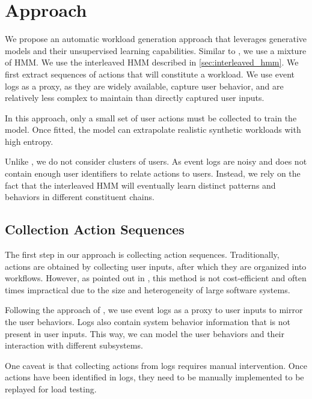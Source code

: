 \section{Approach}\label{sec:approach}

We propose an automatic workload generation approach that leverages generative models and their unsupervised learning capabilities. Similar to \cite{Yadwadkar2010-ml}, we use a mixture of HMM. We use the interleaved HMM described in \cref{sec:interleaved_hmm}. We first extract sequences of actions that will constitute a workload. We use event logs as a proxy, as they are widely available, capture user behavior, and are relatively less complex to maintain than directly captured user inputs.

In this approach, only a small set of user actions must be collected to train the model. Once fitted, the model can extrapolate realistic synthetic workloads with high entropy.

Unlike \cite{Chen2019-fu}, we do not consider clusters of users. As event logs are noisy and does not contain enough user identifiers \cite{Zhao2023-nh} to relate actions to users. Instead, we rely on the fact that the interleaved HMM will eventually learn distinct patterns and behaviors in different constituent chains.


\subsection{Collection Action Sequences}

The first step in our approach is collecting action sequences. Traditionally, actions are obtained by collecting user inputs, after which they are organized into workflows. However, as pointed out in \cite{Chen2019-fu}, this method is not cost-efficient and often times impractical due to the size and heterogeneity of large software systems.

Following the approach of \cite{Chen2019-fu}, we use event logs as a proxy to user inputs to mirror the user behaviors. Logs also contain system behavior information that is not present in user inputs. This way, we can model the user behaviors and their interaction with different subsystems.

One caveat is that collecting actions from logs requires manual intervention. Once actions have been identified in logs, they need to be manually implemented to be replayed for load testing.


